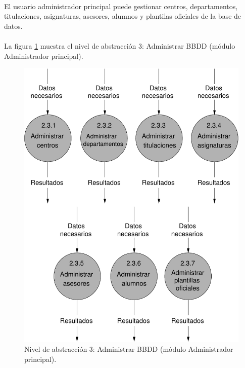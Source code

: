 \paragraph{}El usuario administrador principal puede gestionar centros,
departamentos, titulaciones, asignaturas, asesores, alumnos y plantilas
oficiales de la base de datos.

\paragraph{}La figura \ref{diagramaNivel3-AdministrarBBDD} muestra el nivel de
abstracción 3: Administrar BBDD (módulo Administrador principal).

  \begin{figure}[!ht]
    \begin{center}
      \includegraphics[]{08.Analisis_Funcional/8.2.DFDs/Niveles/Nivel3/AdministradorPrincipal/AdministrarBBDD/Diagramas/nivel3-AdministrarBBDD.pdf}
      \caption{Nivel de abstracción 3: Administrar BBDD (módulo Administrador
      principal).}
      \label{diagramaNivel3-AdministrarBBDD}
    \end{center}
  \end{figure}
